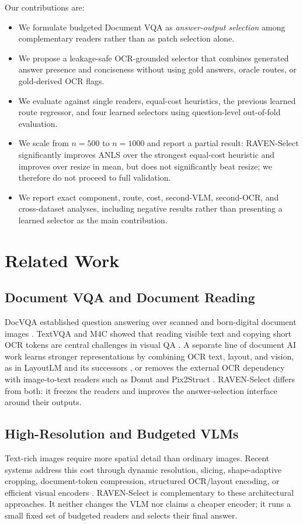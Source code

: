 \documentclass[journal]{IEEEtran}
\begin{document}
Our contributions are:
\begin{itemize}[leftmargin=*]
  \item We formulate budgeted Document VQA as \emph{answer-output selection}
  among complementary readers rather than as patch selection alone.
  \item We propose a leakage-safe OCR-grounded selector that combines generated
  answer presence and conciseness without using gold answers, oracle routes, or
  gold-derived OCR flags.
  \item We evaluate against single readers, equal-cost heuristics, the previous
  learned route regressor, and four learned selectors using question-level
  out-of-fold evaluation.
  \item We scale from $n{=}500$ to $n{=}1000$ and report a partial result:
  RAVEN-Select significantly improves ANLS over the strongest equal-cost
  heuristic and improves over resize in mean, but does not significantly beat
  resize; we therefore do not proceed to full validation.
  \item We report exact component, route, cost, second-VLM, second-OCR, and
  cross-dataset analyses, including negative results rather than presenting a
  learned selector as the main contribution.
\end{itemize}

\section{Related Work}
\subsection{Document VQA and Document Reading}
DocVQA established question answering over scanned and born-digital document
images \cite{docvqa}.  TextVQA and M4C showed that reading visible text and
copying short OCR tokens are central challenges in visual QA
\cite{textvqa,m4c}.  A separate line of document AI work learns stronger
representations by combining OCR text, layout, and vision, as in LayoutLM and
its successors \cite{layoutlm,layoutlmv2,layoutlmv3,udop}, or removes the
external OCR dependency with image-to-text readers such as Donut and
Pix2Struct \cite{donut,pix2struct}.  RAVEN-Select differs from both: it freezes
the readers and improves the answer-selection interface around their outputs.

\subsection{High-Resolution and Budgeted VLMs}
Text-rich images require more spatial detail than ordinary images.  Recent
systems address this cost through dynamic resolution, slicing, shape-adaptive
cropping, document-token compression, structured OCR/layout encoding, or
efficient visual encoders
\cite{qwen25vl,llavauhd,ureader,docowl2,docvlm,fastvlm}.  RAVEN-Select is
complementary to these architectural approaches.  It neither changes the VLM
nor claims a cheaper encoder; it runs a small fixed set of budgeted readers and
selects their final answer.
\end{document}
